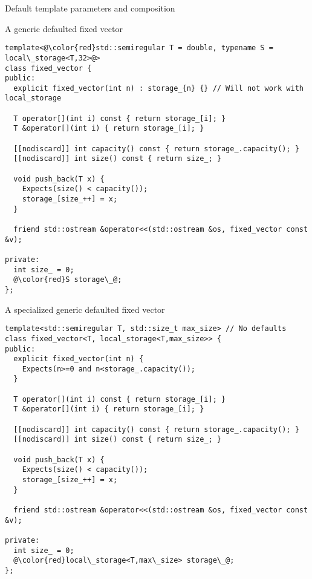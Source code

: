 \begin{frame}[t,fragile]{Default template parameters and composition}
\begin{block}{A generic defaulted fixed vector}
\begin{lstlisting}[basicstyle=\tiny,escapechar=@]
template<@\color{red}std::semiregular T = double, typename S = local\_storage<T,32>@>
class fixed_vector {
public:
  explicit fixed_vector(int n) : storage_{n} {} // Will not work with local_storage

  T operator[](int i) const { return storage_[i]; }
  T &operator[](int i) { return storage_[i]; }

  [[nodiscard]] int capacity() const { return storage_.capacity(); }
  [[nodiscard]] int size() const { return size_; }

  void push_back(T x) {
    Expects(size() < capacity());
    storage_[size_++] = x;
  }

  friend std::ostream &operator<<(std::ostream &os, fixed_vector const &v);

private:
  int size_ = 0;
  @\color{red}S storage\_@;
};
\end{lstlisting}
\end{block}
\end{frame}

\begin{frame}[t,fragile]
\begin{block}{A specialized generic defaulted fixed vector}
\begin{lstlisting}[basicstyle=\tiny, escapechar=@]
template<std::semiregular T, std::size_t max_size> // No defaults
class fixed_vector<T, local_storage<T,max_size>> {
public:
  explicit fixed_vector(int n) {
    Expects(n>=0 and n<storage_.capacity());
  }

  T operator[](int i) const { return storage_[i]; }
  T &operator[](int i) { return storage_[i]; }

  [[nodiscard]] int capacity() const { return storage_.capacity(); }
  [[nodiscard]] int size() const { return size_; }

  void push_back(T x) {
    Expects(size() < capacity());
    storage_[size_++] = x;
  }

  friend std::ostream &operator<<(std::ostream &os, fixed_vector const &v);

private:
  int size_ = 0;
  @\color{red}local\_storage<T,max\_size> storage\_@;
};
\end{lstlisting}
\end{block}
\end{frame}
